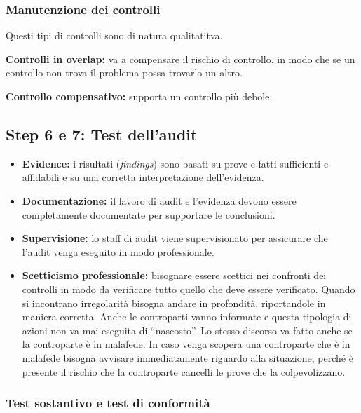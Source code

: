 \subsubsection{Manutenzione dei controlli}

Questi tipi di controlli sono di natura qualitatitva.

\textbf{Controlli in overlap:} va a compensare il rischio di controllo, in modo che se 
un controllo non trova il problema possa trovarlo un altro.

\textbf{Controllo compensativo:} supporta un controllo più debole.

\subsection{Step 6 e 7: Test dell'audit}

\begin{itemize}
\item \textbf{Evidence:} i risultati (\emph{findings}) sono basati su prove e fatti 
sufficienti e affidabili e su una corretta interpretazione dell'evidenza. 

\item \textbf{Documentazione:} il lavoro di audit e l'evidenza 
devono essere completamente documentate per supportare le conclusioni.

\item \textbf{Supervisione:} lo staff di audit viene supervisionato per assicurare che l'audit 
venga eseguito in modo professionale.

\item \textbf{Scetticismo professionale:} bisognare essere scettici nei confronti dei 
controlli in modo da verificare tutto quello che deve essere verificato.
Quando si incontrano irregolarità bisogna andare in profondità, riportandole 
in maniera corretta. Anche le controparti vanno informate e questa tipologia di 
azioni non va mai eseguita di ``nascosto''. Lo stesso discorso va fatto anche 
se la controparte è in malafede. In caso venga scopera una controparte che è in 
malafede bisogna avvisare immediatamente riguardo alla situazione, perché è 
presente il rischio che la controparte cancelli le prove che la colpevolizzano.
\end{itemize}

\subsubsection{Test sostantivo e test di conformità}

